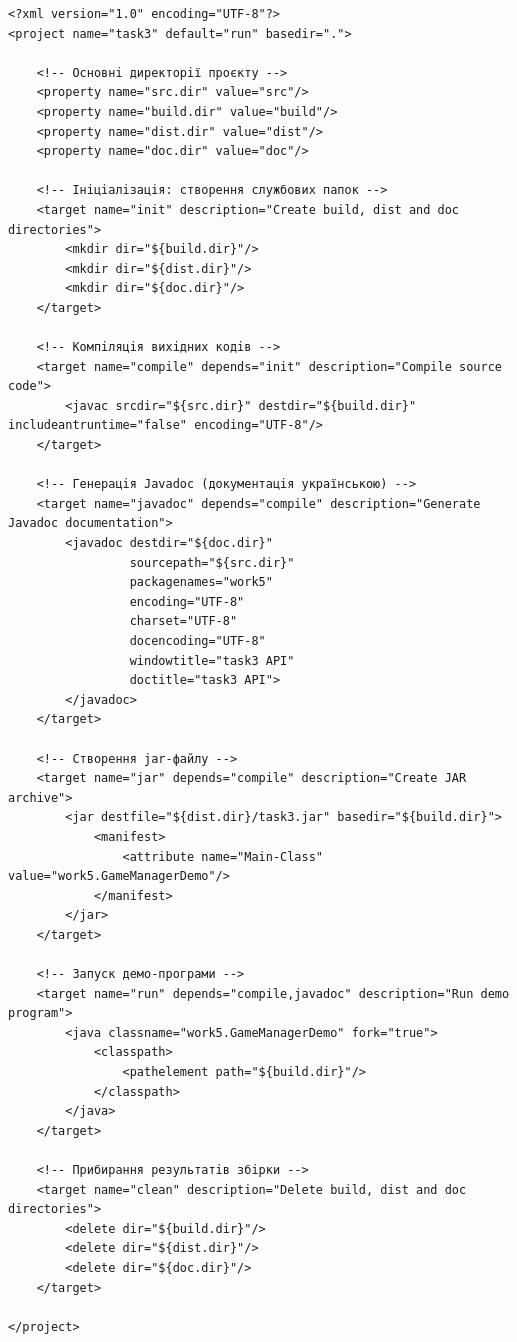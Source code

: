 \documentclass[12pt,a4paper]{article}
\begin{document}
    \begin{verbatim}
<?xml version="1.0" encoding="UTF-8"?>
<project name="task3" default="run" basedir=".">

    <!-- Основнi директорiї проєкту -->
    <property name="src.dir" value="src"/>
    <property name="build.dir" value="build"/>
    <property name="dist.dir" value="dist"/>
    <property name="doc.dir" value="doc"/>

    <!-- Iнiцiалiзацiя: створення службових папок -->
    <target name="init" description="Create build, dist and doc directories">
        <mkdir dir="${build.dir}"/>
        <mkdir dir="${dist.dir}"/>
        <mkdir dir="${doc.dir}"/>
    </target>

    <!-- Компiляцiя вихiдних кодiв -->
    <target name="compile" depends="init" description="Compile source code">
        <javac srcdir="${src.dir}" destdir="${build.dir}" includeantruntime="false" encoding="UTF-8"/>
    </target>

    <!-- Генерацiя Javadoc (документацiя українською) -->
    <target name="javadoc" depends="compile" description="Generate Javadoc documentation">
        <javadoc destdir="${doc.dir}"
                 sourcepath="${src.dir}"
                 packagenames="work5"
                 encoding="UTF-8"
                 charset="UTF-8"
                 docencoding="UTF-8"
                 windowtitle="task3 API"
                 doctitle="task3 API">
        </javadoc>
    </target>

    <!-- Створення jar-файлу -->
    <target name="jar" depends="compile" description="Create JAR archive">
        <jar destfile="${dist.dir}/task3.jar" basedir="${build.dir}">
            <manifest>
                <attribute name="Main-Class" value="work5.GameManagerDemo"/>
            </manifest>
        </jar>
    </target>

    <!-- Запуск демо-програми -->
    <target name="run" depends="compile,javadoc" description="Run demo program">
        <java classname="work5.GameManagerDemo" fork="true">
            <classpath>
                <pathelement path="${build.dir}"/>
            </classpath>
        </java>
    </target>

    <!-- Прибирання результатiв збiрки -->
    <target name="clean" description="Delete build, dist and doc directories">
        <delete dir="${build.dir}"/>
        <delete dir="${dist.dir}"/>
        <delete dir="${doc.dir}"/>
    </target>

</project>
    \end{verbatim}
\end{document}
